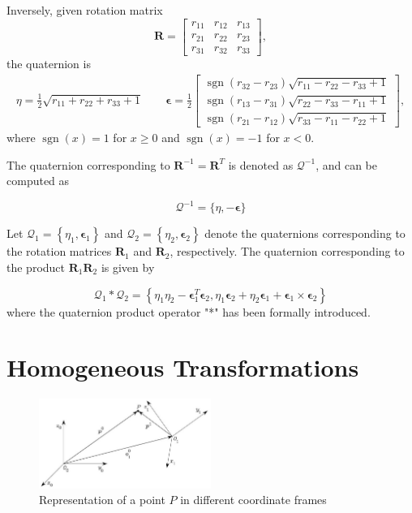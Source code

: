 \documentclass[10pt]{article}
\begin{document}
Inversely, given rotation matrix
$$
\boldsymbol{R}=\left[\begin{array}{lll}
r_{11} & r_{12} & r_{13} \\
r_{21} & r_{22} & r_{23} \\
r_{31} & r_{32} & r_{33}
\end{array}\right],
$$
the quaternion is 
$$
\begin{aligned}
\eta  =\frac{1}{2} \sqrt{r_{11}+r_{22}+r_{33}+1} \qquad
\boldsymbol{\epsilon}  =\frac{1}{2}\left[\begin{array}{l}
\operatorname{sgn}\left(r_{32}-r_{23}\right) \sqrt{r_{11}-r_{22}-r_{33}+1} \\
\operatorname{sgn}\left(r_{13}-r_{31}\right) \sqrt{r_{22}-r_{33}-r_{11}+1} \\
\operatorname{sgn}\left(r_{21}-r_{12}\right) \sqrt{r_{33}-r_{11}-r_{22}+1}
\end{array}\right],
\end{aligned}
$$
where  $\operatorname{sgn}(x)=1$ for $x \geq 0$ and $\operatorname{sgn}(x)=-1$ for $x<0$. 


The quaternion corresponding to $\boldsymbol{R}^{-1}=\boldsymbol{R}^{T}$ is denoted as $\mathcal{Q}^{-1}$, and can be computed as

$$
\mathcal{Q}^{-1}=\{\eta,-\boldsymbol{\epsilon}\}
$$

Let $\mathcal{Q}_{1}=\left\{\eta_{1}, \boldsymbol{\epsilon}_{1}\right\}$ and $\mathcal{Q}_{2}=\left\{\eta_{2}, \boldsymbol{\epsilon}_{2}\right\}$ denote the quaternions corresponding to the rotation matrices $\boldsymbol{R}_{1}$ and $\boldsymbol{R}_{2}$, respectively. The quaternion corresponding to the product $\boldsymbol{R}_{1} \boldsymbol{R}_{2}$ is given by

$$
\mathcal{Q}_{1} * \mathcal{Q}_{2}=\left\{\eta_{1} \eta_{2}-\boldsymbol{\epsilon}_{1}^{T} \boldsymbol{\epsilon}_{2}, \eta_{1} \boldsymbol{\epsilon}_{2}+\eta_{2} \boldsymbol{\epsilon}_{1}+\boldsymbol{\epsilon}_{1} \times \boldsymbol{\epsilon}_{2}\right\}
$$
where the quaternion product operator "*" has been formally introduced.


\section{Homogeneous Transformations}

\begin{figure}[h]
    \centering
   \includegraphics[max width=0.5\textwidth]{./kinematics/homogenenous_transformation}
    \caption{Representation of a point $P$ in different coordinate frames}
    \label{c1.fig.homogeneous}
\end{figure}
\end{document}

